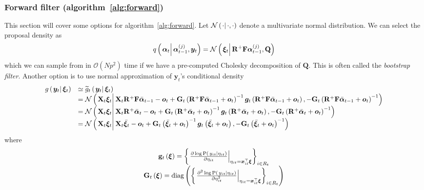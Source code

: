 \documentclass[9pt, notitlepage]{article}
\renewcommand{\vec}[1]{\bm{#1}}
\newcommand{\vecb}[1]{\bar{\vec{#1}}}
\newcommand{\mat}[1]{\mathbf{#1}}
\newcommand{\Lbrace}[1]{\left\{ #1\right\}}
\newcommand{\Lparen}[1]{\left( #1\right)}
\newcommand{\Cond}[2]{\left. #1 \vphantom{#2} \right\vert  #2}
\newcommand{\Prob}{\text{P}}
\newcommand{\optor}[2]{#1\Lparen{#2}}
\newcommand{\optorC}[3]{\optor{#1}{\Cond{#2}{#3}}}
\newcommand{\propC}[2]{\optorC{\Prob}{#1}{#2}}
\newcommand{\normalC}[3]{\optorC{\mathcal{N}}{#1}{#2,#3}}
\newcommand{\IDC}[2]{\optorC{q}{#1}{#2}}
\newcommand{\diag}[1]{\optor{\text{diag}}{#1}}
\newcommand{\partic}[3]{#1_{#2}^{\Lparen{#3}}}
\newcommand{\bigO}[1]{\mathcal{O}\Lparen{#1}}
\newcommand{\dimState}{p}
\newcommand{\nPart}{N}
\begin{document}
\subsubsection*{Forward filter (algorithm~\ref{alg:forward})}
This section will cover some options for algorithm~\ref{alg:forward}. Let $\normalC{\cdot}{\cdot}{\cdot}$ denote a multivariate normal distribution. We can select the proposal density as%
%
\begin{equation}
	\IDC{\vec{\alpha}_t}{\partic{\vec{\alpha}}{t-1}{j}, \vec{y}_t} = %
		\normalC{\vec{\xi}_t}{\mat{R}^{+}\mat{F}\partic{\vec{\alpha}}{t-1}{j}}{\mat{Q}}
\end{equation}%
%
which we can sample from in $\bigO{\nPart \dimState^2}$ time if we have a pre-computed Cholesky decomposition of $\mat{Q}$. This is often called the \emph{bootstrap filter}. Another option is to use normal approximation of $\vec{y}_t$'s conditional density%
%
{\scriptsize %
\begin{equation}\begin{array}{cl}
	\optorC{g}{\vec{y}_t}{\vec{\xi}_t} & \simeq  \optorC{\widetilde{g}_t}{\vec{y}_t}{\vec{\xi}_t} \\ 
%
&= \normalC{
		\mat{X}_t\vec{\xi}_t
	}{ %
		\mat{X}_t\mat{R}^{+}\mat{F}\vecb{\alpha}_{t - 1} - \vec{o}_t + 
		\mat{G}_t\Lparen{\mat{R}^{+}\mat{F}\vecb{\alpha}_{t - 1} + \vec{o}_t}^{-1}
		\vec{g}_t\Lparen{\mat{R}^{+}\mat{F}\vecb{\alpha}_{t - 1} + \vec{o}_t}
	}{ %
		- \mat{G}_t\Lparen{\mat{R}^{+}\mat{F}\vecb{\alpha}_{t - 1} + \vec{o}_t}^{-1}
	} \\
%
&= \normalC{
		\mat{X}_t\vec{\xi}_t
	}{ %
		\mat{X}_t\mat{R}^{+}\vecb{\alpha}_{t} - \vec{o}_t + 
		\mat{G}_t\Lparen{\mat{R}^{+}\vecb{\alpha}_{t} + \vec{o}_t}^{-1}
		\vec{g}_t\Lparen{\mat{R}^{+}\vecb{\alpha}_{t} + \vec{o}_t}
	}{ %
		- \mat{G}_t\Lparen{\mat{R}^{+}\vecb{\alpha}_{t} + \vec{o}_t}^{-1}
	} \\
%
&= \normalC{
		\mat{X}_t\vec{\xi}_t
	}{ %
		\mat{X}_t\vecb{\xi}_{t} - \vec{o}_t + 
		\mat{G}_t\Lparen{\vecb{\xi}_{t} + \vec{o}_t}^{-1}
		\vec{g}_t\Lparen{\vecb{\xi}_{t} + \vec{o}_t}
	}{ %
		- \mat{G}_t\Lparen{\vecb{\xi}_{t} + \vec{o}_t}^{-1}
	} \\ 
\end{array}\end{equation}%
}%
%
where%
%
\begin{equation}\begin{array}{c}
\mat{g}_t\Lparen{\vec{\xi}} =
		\Lbrace{\left.\frac{
		\partial \log \propC{y_{it}}{\eta_{it}}
	}{
		\partial\eta_{it}
	}\right|_{\eta_{it} = \vec{x}_{it}^\top\vec{\xi}} }_{i \in R_t} \\
%
	\mat{G}_t\Lparen{\vec{\xi}} =
		\diag{\Lbrace{\left.\frac{
		\partial^2 \log \propC{y_{it}}{\eta_{it}}
	}{
		\partial\eta_{it}^2
	}\right|_{\eta_{it} = \vec{x}_{it}^\top\vec{\xi}} }_{i \in R_t}}
\end{array}\end{equation}
\end{document}
